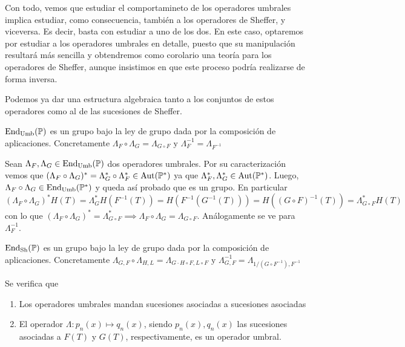 Con todo, vemos que estudiar el comportamineto de los operadores umbrales implica estudiar, como consecuencia, también a los operadores de Sheffer, y viceversa. Es decir, basta con estudiar a uno de los dos. En este caso, optaremos por estudiar a los operadores umbrales en detalle, puesto que su manipulación resultará más sencilla y obtendremos como corolario una teoría para los operadores de Sheffer, aunque insistimos en que este proceso podría realizarse de forma inversa. 

Podemos ya dar una estructura algebraica tanto a los conjuntos de estos operadores como al de las sucesiones de Sheffer. 

\begin{teorema}
    $\operatorname*{End}_{\mathrm{Umb}}(\mathbb{P})$ es un grupo bajo la ley de grupo dada por la composición de aplicaciones. Concretamente $\Lambda_F \circ \Lambda_G = \Lambda_{G \circ F} \text{ y } \Lambda_F^{-1} = \Lambda_{F^{-1}}$
\end{teorema}

\begin{demo}
    Sean $\Lambda_F, \Lambda_G \in \operatorname*{End}_{\mathrm{Umb}}(\mathbb{P})$ dos operadores umbrales. Por su caracterización vemos que $(\Lambda_F \circ \Lambda_G)^* = \Lambda_G^* \circ \Lambda_F^* \in \operatorname*{Aut}(\mathbb{P}^*)$ ya que $\Lambda_F^*, \Lambda_G^* \in \operatorname*{Aut}(\mathbb{P}^*)$. Luego, $\Lambda_F \circ \Lambda_G \in \operatorname*{End}_{\textrm{Umb}}(\mathbb{P}^*)$ y queda así probado que es un grupo. En particular
    \begin{equation*}
        (\Lambda_F \circ \Lambda_G)^*H(T) = \Lambda_G^* H(F^{-1}(T)) = H(F^{-1}(G^{-1}(T))) = H((G \circ F)^{-1}(T)) = \Lambda_{G \circ F}^*H(T)
    \end{equation*}
    con lo que $(\Lambda_F \circ \Lambda_G)^* = \Lambda_{G \circ F}^* \implies \Lambda_F \circ \Lambda_G = \Lambda_{G \circ F}$. Análogamente se ve para $\Lambda_F^{-1}$.
\end{demo}

\begin{corolario}
    $\operatorname*{End}_{\mathrm{Sh}}(\mathbb{P})$ es un grupo bajo la ley de grupo dada por la composición de aplicaciones. Concretamente $\Lambda_{G,F} \circ \Lambda_{H,L} = \Lambda_{G \cdot H \circ F, L \circ F} \text{ y } \Lambda_{G, F}^{-1} = \Lambda_{1/(G \circ F^{-1}), F^{-1}}$
\end{corolario}

\begin{proposicion} Se verifica que
    \begin{enumerate}
        \item Los operadores umbrales mandan sucesiones asociadas a sucesiones asociadas
        \item El operador $\Lambda: p_n(x) \mapsto q_n(x)$, siendo $p_n(x), q_n(x)$ las sucesiones asociadas a $F(T)$ y $G(T)$, respectivamente, es un operador umbral.
    \end{enumerate}
\end{proposicion}

